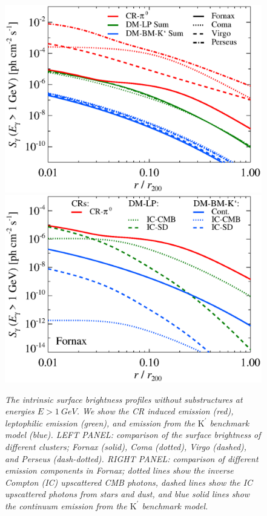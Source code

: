 \documentclass[10pt,aps,pra,reprint,amsmath,amsfonts,amssymb,showpacs,nofootinbib,floatfix]{revtex4-1}
\newcommand{\rmn}{\mathrm}
\newcommand{\Kp}{\rmn{K}^\prime}
\begin{document}
\begin{figure}
\begin{minipage}{2.0\columnwidth}
  \includegraphics[width=0.49\columnwidth]{figures/SB.v12.1GeV.SF300.noSuB.elmu.eps}
  \includegraphics[width=0.49\columnwidth]{figures/SB.fornax.v12.1GeV.SF300.noSuB.elmu.eps}
  \caption{\it The intrinsic surface brightness profiles without
    substructures at energies $E>1\ GeV$. We show the CR induced
    emission (red), leptophilic emission (green), and emission from
    the $\Kp$ benchmark model (blue).  LEFT PANEL: comparison of the surface
    brightness of different clusters; Fornax (solid), Coma (dotted),
    Virgo (dashed), and Perseus (dash-dotted). RIGHT PANEL: comparison of
    different emission components in Fornax; dotted lines show the
    inverse Compton (IC) upscattered CMB photons, dashed lines show
    the IC upscattered photons from stars and dust, and blue solid
    lines show the continuum emission from the $\Kp$ benchmark model.}
 \label{fig:SB_clu_nosub}
\end{minipage}
\end{figure}
\end{document}
